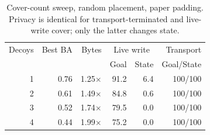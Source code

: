 \begin{table}[t]\centering\footnotesize
\caption{Cover-count sweep, random placement, paper padding. Privacy is identical for transport-terminated and live-write cover; only the latter changes state.}\label{tab:m3-sweep}
\begin{tabular}{@{}rrrrrr@{}}\toprule
Decoys & Best BA & Bytes & \multicolumn{2}{c}{Live write} & Transport\\ & & & Goal & State & Goal/State\\\midrule
1 & 0.76 & 1.25$\times$ & 91.2 & 6.4 & 100/100\\
2 & 0.61 & 1.49$\times$ & 84.8 & 0.6 & 100/100\\
3 & 0.52 & 1.74$\times$ & 79.5 & 0.0 & 100/100\\
4 & 0.44 & 1.99$\times$ & 75.2 & 0.0 & 100/100\\
\bottomrule\end{tabular}\end{table}
